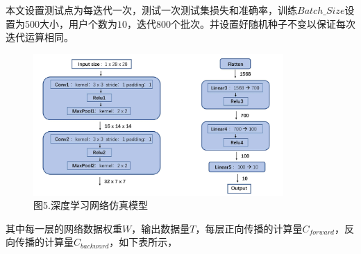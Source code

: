 \documentclass{article}
\begin{document}
本文设置测试点为每迭代一次，测试一次测试集损失和准确率，训练$Batch\_Size$设置为$500$大小，用户个数为$10$，迭代$800$个批次。并设置好随机种子不变以保证每次迭代运算相同。
\begin{figure}[H]
    \centering
    \includegraphics[width=0.85\textwidth]{./figure/4.jpg}  
    \caption*{图5.深度学习网络仿真模型}
\end{figure}

其中每⼀层的⽹络数据权重$W$，输出数据量$T$，每层正向传播的计算量$C_{forward}$，反向传播的计算量$C_{backward}$，如下表所示，
\end{document}
